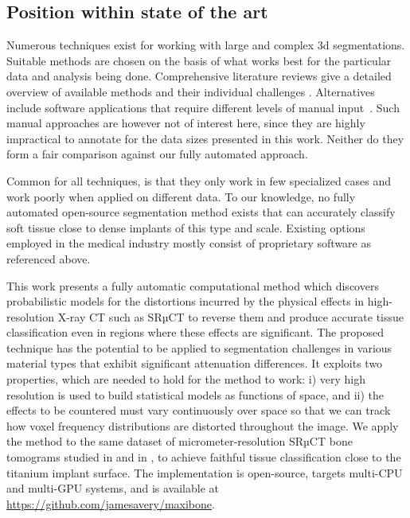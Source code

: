 \subsection*{Position within state of the art}

Numerous techniques exist for working with large and complex 3d segmentations.
Suitable methods are chosen on the basis of what works best for the particular
data and analysis being done. Comprehensive literature reviews give a detailed
overview of available methods and their individual challenges
\cite{seg_literature_review}. Alternatives include software applications that
require different levels of manual
input~\cite{software_pore3d,software_itk_snap,software_dragonfly,software_avizo}.
Such manual approaches are however not of interest here, since they are highly
impractical to annotate for the data sizes presented in this work. Neither do
they form a fair comparison against our fully automated approach.

Common for all techniques, is that they only work in few specialized cases and
work poorly when applied on different data. To our knowledge, no fully automated
open-source segmentation method exists that can accurately classify soft tissue
close to dense implants of this type and scale. Existing options employed in the
medical industry mostly consist of proprietary software as referenced above.

This work presents a fully automatic computational method which discovers
probabilistic models for the distortions incurred by the physical effects in
high-resolution X-ray CT such as SRµCT to reverse them and produce accurate
tissue classification even in regions where these effects are significant. The
proposed technique has the potential to be applied to segmentation challenges in
various material types that exhibit significant attenuation differences. It
exploits two properties, which are needed to hold for the method to work: i)
very high resolution is used to build statistical models as functions of space,
and ii) the effects to be countered must vary continuously over space so that we
can track how voxel frequency distributions are distorted throughout the image.
We apply the method to the same dataset of micrometer-resolution SRµCT bone
tomograms studied in \cite{torsten2018} and in \cite{sporring}, to achieve
faithful tissue classification close to the titanium implant surface. The
implementation is open-source, targets multi-CPU and multi-GPU systems, and is
available at \href{https://github.com/jamesavery/maxibone}
{https://github.com/jamesavery/maxibone}.

